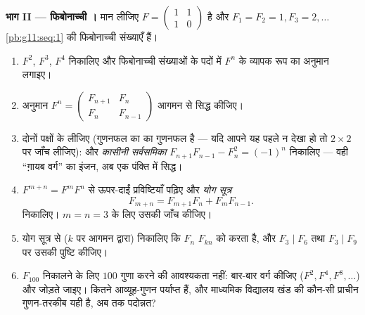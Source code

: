 \begin{problem}
\medskip
\noindent\textbf{भाग II --- फिबोनाच्ची ।}
मान लीजिए $F = \begin{pmatrix} 1 & 1\\ 1 & 0\end{pmatrix}$ है और $F_1 = F_2 = 1, F_3 = 2, \dots$ \cref{pb:g11:seq:1} की फिबोनाच्ची संख्याएँ हैं।
\begin{enumerate}[resume]
  \item $F^2$, $F^3$, $F^4$ निकालिए और फिबोनाच्ची संख्याओं के पदों में $F^n$
        के व्यापक रूप का अनुमान लगाइए।
  \item अनुमान $F^n = \begin{pmatrix} F_{n+1} & F_n\\ F_n & F_{n-1}
        \end{pmatrix}$ आगमन से सिद्ध कीजिए।
  \item दोनों पक्षों के  लीजिए (गुणनफल का   का गुणनफल है
        --- यदि आपने यह पहले न देखा हो तो $2 \times 2$  पर जाँच लीजिए): और
        \emph{कासीनी सर्वसमिका} $F_{n+1}F_{n-1} - F_n^2 = (-1)^n$ निकालिए --- वही ``ग़ायब वर्ग'' का
        इंजन, अब एक पंक्ति में सिद्ध।
  \item $F^{m+n} = F^m F^n$ से ऊपर-दाईं प्रविष्टियाँ पढ़िए और \emph{योग सूत्र}
        \[
        F_{m+n} = F_{m+1} F_n + F_m F_{n-1} .
        \]
        निकालिए। $m = n = 3$ के लिए उसकी जाँच कीजिए।
  \item योग सूत्र से ($k$ पर आगमन द्वारा) निकालिए कि $F_n$ $F_{kn}$ को
         करता है, और $F_3 \mid F_6$ तथा $F_3 \mid F_9$ पर उसकी पुष्टि कीजिए।
  \item $F_{100}$ निकालने के लिए $100$  गुणा करने की आवश्यकता नहीं: बार-बार
        वर्ग कीजिए ($F^2, F^4, F^8, \dots$) और जोड़ते जाइए। कितने आव्यूह-गुणन पर्याप्त हैं,
        और माध्यमिक विद्यालय खंड की कौन-सी प्राचीन गुणन-तरकीब यही है, अब
         तक पदोन्नत?
\end{enumerate}


\end{problem}
